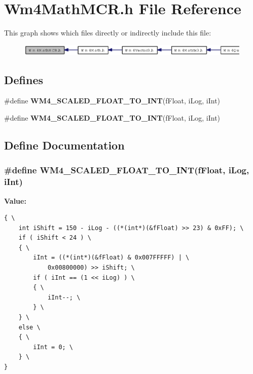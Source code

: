 \section{Wm4Math\-MCR.h File Reference}
\label{Wm4MathMCR_8h}


This graph shows which files directly or indirectly include this file:\begin{figure}[H]
\begin{center}
\leavevmode
\includegraphics[width=405pt]{Wm4MathMCR_8h__dep__incl}
\end{center}
\end{figure}
\subsection*{Defines}
\begin{CompactItemize}
\item 
\#define {\bf WM4\_\-SCALED\_\-FLOAT\_\-TO\_\-INT}(f\-Float, i\-Log, i\-Int)
\item 
\#define {\bf WM4\_\-SCALED\_\-FLOAT\_\-TO\_\-INT}(f\-Float, i\-Log, i\-Int)
\end{CompactItemize}


\subsection{Define Documentation}
\subsubsection{\setlength{\rightskip}{0pt plus 5cm}\#define WM4\_\-SCALED\_\-FLOAT\_\-TO\_\-INT(f\-Float, i\-Log, i\-Int)}\label{Wm4MathMCR_8h_00ef31d3042640b57b3521e582dadf51}


\textbf{Value:}

\begin{Code}\begin{verbatim}{ \
    int iShift = 150 - iLog - ((*(int*)(&fFloat) >> 23) & 0xFF); \
    if ( iShift < 24 ) \
    { \
        iInt = ((*(int*)(&fFloat) & 0x007FFFFF) | \
            0x00800000) >> iShift; \
        if ( iInt == (1 << iLog) ) \
        { \
            iInt--; \
        } \
    } \
    else \
    { \
        iInt = 0; \
    } \
}
\end{verbatim}\end{Code}
